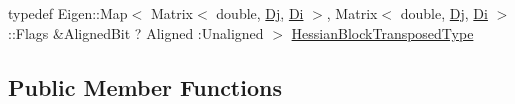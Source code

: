 \begin{DoxyCompactItemize}
\item 
typedef Eigen\+::\+Map$<$ Matrix$<$ double, \mbox{\hyperlink{classg2o_1_1_base_binary_edge_ab718b94950a34d589371fe6f5583b259}{Dj}}, \mbox{\hyperlink{classg2o_1_1_base_binary_edge_abfe232196405a7204bc299a747c1cc8b}{Di}} $>$, Matrix$<$ double, \mbox{\hyperlink{classg2o_1_1_base_binary_edge_ab718b94950a34d589371fe6f5583b259}{Dj}}, \mbox{\hyperlink{classg2o_1_1_base_binary_edge_abfe232196405a7204bc299a747c1cc8b}{Di}} $>$\+::Flags \&Aligned\+Bit ? Aligned \+:Unaligned $>$ \mbox{\hyperlink{classg2o_1_1_base_binary_edge_aec0d5b1819f702b7658574fcd6324b49}{Hessian\+Block\+Transposed\+Type}}
\end{DoxyCompactItemize}
\subsection*{Public Member Functions}
